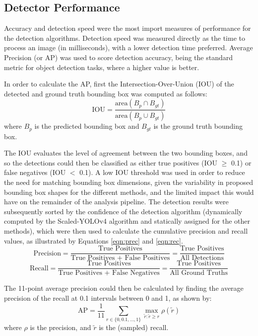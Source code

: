 \documentclass[10pt]{article}
\begin{document}
\subsection{Detector Performance}
Accuracy and detection speed were the most import measures of performance for the detection algorithms. Detection speed was measured directly as the time to process an image (in milliseconds), with a lower detection time preferred. Average Precision (or AP) was used to score detection accuracy, being the standard metric for object detection tasks, where a higher value is better.

In order to calculate the AP, first the Intersection-Over-Union (IOU) of the detected and ground truth bounding box was computed as follows:
\begin{equation}
    \text{IOU} = \frac{\text{area}(B_p \cap B_{gt})}{\text{area}(B_p \cup B_{gt})}
    \label{eqn:iou}
\end{equation}
where $B_p$ is the predicted bounding box and $B_{gt}$ is the ground truth bounding box. 

The IOU evaluates the level of agreement between the two bounding boxes, and so the detections could then be classified as either true positives (IOU $\geq$ 0.1) or false negatives (IOU $<$ 0.1). A low IOU threshold was used in order to reduce the need for matching bounding box dimensions, given the variability in proposed bounding box shapes for the different methods, and the limited impact this would have on the remainder of the analysis pipeline. The detection results were subsequently sorted by the confidence of the detection algorithm (dynamically computed by the Scaled-YOLOv4 algorithm and statically assigned for the other methods), which were then used to calculate the cumulative precision and recall values, as illustrated by Equations \ref{eqn:prec} and \ref{eqn:rec}.
\begin{equation}
    \text{Precision} = \frac{\text{True Positives}}{\text{True Positives + False Positives}} = \frac{\text{True Positives}}{\text{All Detections}}
    \label{eqn:prec}
\end{equation}
\begin{equation}
    \text{Recall} = \frac{\text{True Positives}}{\text{True Positives + False Negatives}} = \frac{\text{True Positives}}{\text{All Ground Truths}}
    \label{eqn:rec}
\end{equation}

The 11-point average precision \cite{everingham2010pascal} could then be calculated by finding the average precision of the recall at 0.1 intervals between 0 and 1, as shown by:
\begin{equation}
    \text{AP} = \frac{1}{11}\sum_{r\in \{0, 0.1, ..., 1\}} \max_{\tilde{r}:\tilde{r}\geq r} \rho(\tilde{r})
    \label{eqn:ap}
\end{equation}
where $\rho$ is the precision, and $\tilde{r}$ is the (sampled) recall.
\end{document}

